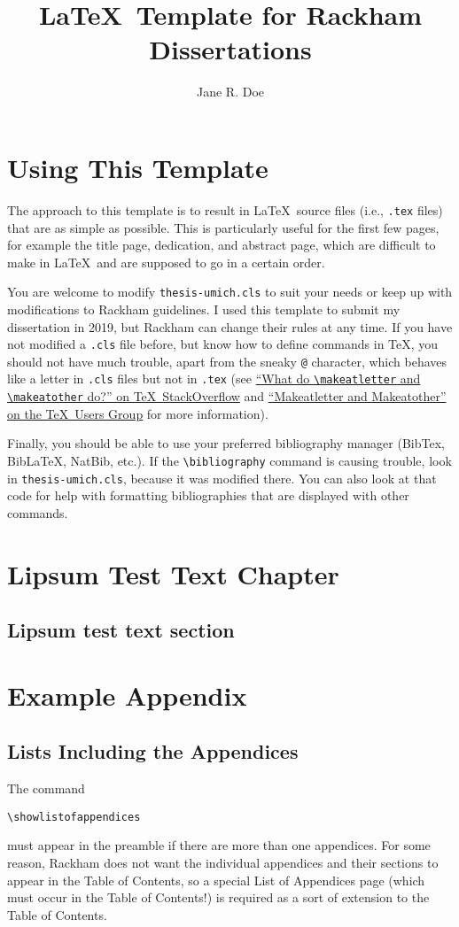 \documentclass[thesis]{thesis-umich}
\title{\LaTeX\ Template for Rackham Dissertations}
\author{Jane R. Doe}
\begin{document}
\chapter{Using This Template}
The approach to this template is to result in \LaTeX~source files (i.e.,
\texttt{.tex} files) that are as simple as possible.  This is particularly
useful for the first few pages, for example the title page, dedication, and
abstract page, which are difficult to make in \LaTeX~and are supposed to go in
a certain order.

You are welcome to modify \texttt{thesis-umich.cls} to suit your needs or keep
up with modifications to Rackham guidelines. I used this template to submit my
dissertation in 2019, but Rackham can change their rules at any time. If you
have not modified a \texttt{.cls} file before, but know how to define commands
in \TeX, you should not have much trouble, apart from the sneaky \verb=@=
character, which behaves like a letter in \texttt{.cls} files but not in
\texttt{.tex} (see \href{https://tex.stackexchange.com/q/8351/21027}{``What do
  \texttt{\textbackslash makeatletter} and \texttt{\textbackslash makeatother}
do?'' on \TeX\ StackOverflow} and
\href{https://tug.org/pipermail/tugindia/2002-January/000178.html}{``Makeatletter
and Makeatother'' on the \TeX\ Users Group} for more information).

Finally, you should be able to use your preferred bibliography manager (BibTex, BibLaTeX, NatBib, etc.). If the \texttt{\textbackslash bibliography} command is causing trouble, look in \texttt{thesis-umich.cls}, because it was modified there. You can also look at that code for help with formatting bibliographies that are displayed with other commands.

\chapter{Lipsum Test Text Chapter}
\section{Lipsum test text section}
\lipsum[1]


\appendix
\chapter{Example Appendix}

\section{Lists Including the Appendices}
The command
\begin{verbatim}
\showlistofappendices
\end{verbatim}
must appear in the preamble if there are more than one appendices.  For
some reason, Rackham does not want the individual appendices and their
sections to appear in the Table of Contents, so a special List of
Appendices page (which must occur in the Table of Contents!) is required
as a sort of extension to the Table of Contents.

\nocite{*}




\end{document}
